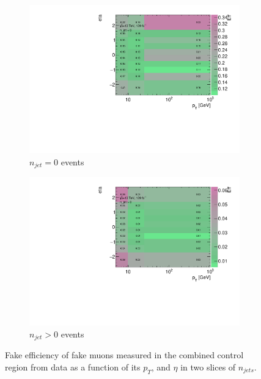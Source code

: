 \begin{figure}[htb]
        \begin{center}
        \begin{subfigure}{.48\textwidth}
            \centering
            \includegraphics[width=.95\linewidth]{figures/Analysis/Background/njet0_FakeEfficiency3D_mu_pt_eta.pdf}
            \caption{$n_{jet}=0$ events \label{fig:FakeEff_3D_Muon_njet0}}
        \end{subfigure}
        \begin{subfigure}{.48\textwidth}
            \centering
            \includegraphics[width=.95\linewidth]{figures/Analysis/Background/njet1_FakeEfficiency3D_mu_pt_eta.pdf}
            \caption{$n_{jet}>0$ events \label{fig:FakeEff_3D_Muon_njet1}}
        \end{subfigure}
        \end{center}
    \caption{Fake efficiency of fake muons measured in the combined control region from data as a function of its $p_{T}$, and $\eta$ in two slices of $n_{jets}$. \label{fig:MuonFakeEff}}
\end{figure}


